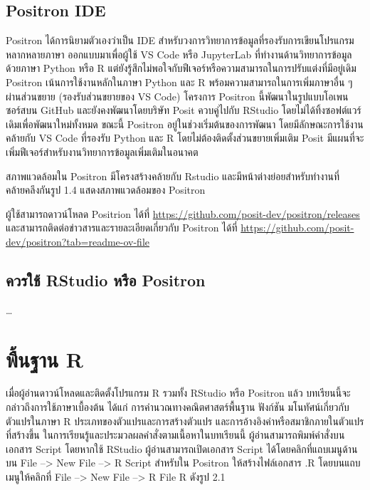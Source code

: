 \documentclass[
  a4paper,
]{book}
\begin{document}
\section{Positron IDE}\label{positron-ide}

Positron ได้การนิยามตัวเองว่าเป็น IDE
สำหรับวงการวิทยาการข้อมูลที่รองรับการเขียนโปรแกรมหลากหลายภาษา ออกแบบมาเพื่อผู้ใช้ VS
Code หรือ JupyterLab ที่ทำงานด้านวิทยาการข้อมูลด้วยภาษา Python หรือ R
แต่ยังรู้สึกไม่พอใจกับฟีเจอร์หรือความสามารถในการปรับแต่งที่มีอยู่เดิม Positron
เน้นการใช้งานหลักในภาษา Python และ R พร้อมความสามารถในการเพิ่มภาษาอื่น ๆ
ผ่านส่วนขยาย (รองรับส่วนขยายของ VS Code) โครงการ Positron
นี้พัฒนาในรูปแบบโอเพนซอร์สบน GitHub และยังคงพัฒนาโดยบริษัท Posit ควบคู่ไปกับ RStudio
โดยไม่ได้ทิ้งซอฟต์แวร์เดิมเพื่อพัฒนาใหม่ทั้งหมด ขณะนี้ Positron อยู่ในช่วงเริ่มต้นของการพัฒนา
โดยมีลักษณะการใช้งานคล้ายกับ VS Code ที่รองรับ Python และ R
โดยไม่ต้องติดตั้งส่วนขยายเพิ่มเติม Posit
มีแผนที่จะเพิ่มฟีเจอร์สำหรับงานวิทยาการข้อมูลเพิ่มเติมในอนาคต

สภาพแวดล้อมใน Positron มีโครงสร้างคล้ายกับ Rstudio
และมีหน้าต่างย่อยสำหรับทำงานที่คล้ายคลึงกันรูป 1.4 แสดงสภาพแวดล้อมของ Positron

ผู้ใช้สามารถดาวน์โหลด Positrion ได้ที่
\url{https://github.com/posit-dev/positron/releases}
และสามารถติดต่อข่าวสารและรายละเอียดเกี่ยวกับ Positron ได้ที่
\url{https://github.com/posit-dev/positron?tab=readme-ov-file}

\section{ควรใช้ RStudio หรือ
Positron}\label{uxe04uxe27uxe23uxe43uxe0a-rstudio-uxe2buxe23uxe2d-positron}

\ldots{}


\chapter{พื้นฐาน R}\label{uxe1euxe19uxe10uxe32uxe19-r}

เมื่อผู้อ่านดาวน์โหลดและติดตั้งโปรแกรม R รวมทั้ง RStudio หรือ Positron แล้ว
บทเรียนนี้จะกล่าวถึงการใช้ภาษาเบื้องต้น ได้แก่ การคำนวณทางคณิตศาสตร์พื้นฐาน ฟังก์ชัน
มโนทัศน์เกี่ยวกับตัวแปรในภาษา R ประเภทของตัวแปรและการสร้างตัวแปร
และการอ้างอิงค่าหรือสมาชิกภายในตัวแปรที่สร้างขึ้น
ในการเรียนรู้และประมวลผลคำสั่งตามเนื้อหาในบทเรียนนี้ ผู้อ่านสามารถพิมพ์คำสั่งบนเอกสาร
Script โดยหากใช้ RStudio ผู้อ่านสามารถเปิดเอกสาร Script ได้โดยคลิกที่แถบเมนูด้านบน
File --\textgreater{} New File --\textgreater{} R Script สำหรับใน
Positron ให้สร้างไฟล์เอกสาร .R โดยบนแถบเมนูให้คลิกที่ File --\textgreater{} New
File --\textgreater{} R File R ดังรูป 2.1
\end{document}

